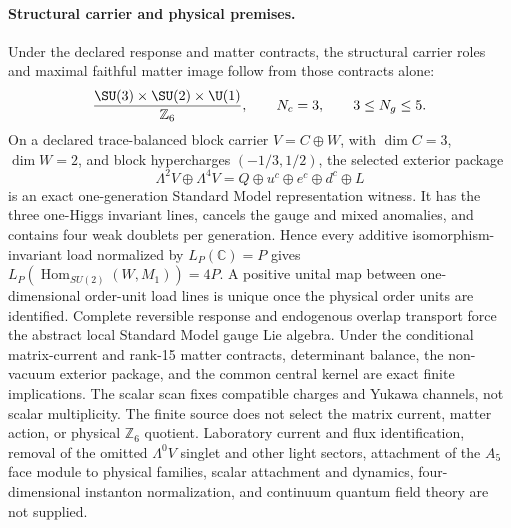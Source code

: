\paragraph{Structural carrier and physical premises.}
Under the declared response and matter contracts, the structural carrier
roles and maximal faithful matter image follow from those contracts alone:
\[
\frac{\SU(3)\times\SU(2)\times\U(1)}{\mathbb Z_6},
\qquad
N_c=3,
\qquad
3\le N_g\le 5 .
\]
On a declared trace-balanced block carrier
\(V=C\oplus W\), with \(\dim C=3\), \(\dim W=2\), and block
hypercharges \((-1/3,1/2)\), the selected exterior package
\[
\Lambda^2V\oplus\Lambda^4V
=Q\oplus u^c\oplus e^c\oplus d^c\oplus L
\]
is an exact one-generation Standard Model representation witness. It has the
three one-Higgs invariant lines, cancels the gauge and mixed anomalies, and
contains four weak doublets per generation. Hence every additive
isomorphism-invariant load normalized by \(L_P(\mathbb C)=P\) gives
\(L_P(\operatorname{Hom}_{SU(2)}(W,M_1))=4P\). A positive unital map between
one-dimensional order-unit load lines is unique once the physical order units
are identified. Complete reversible response and endogenous overlap transport
force the abstract local Standard Model gauge Lie algebra. Under the conditional matrix-current and rank-15
matter contracts, determinant balance, the non-vacuum exterior package, and
the common central kernel are exact finite implications. The scalar scan fixes
compatible charges and Yukawa channels, not scalar multiplicity. The finite
source does not select the matrix current, matter action, or physical
\(\mathbb Z_6\) quotient. Laboratory
current and flux identification, removal of the omitted \(\Lambda^0V\)
singlet and other light sectors, attachment of the \(A_5\) face module to
physical families, scalar attachment and dynamics, four-dimensional instanton
normalization, and continuum quantum field theory are not supplied.

